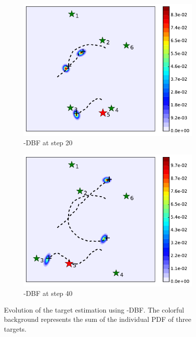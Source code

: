 \begin{figure}
\begin{subfigure}[b]{0.23\textwidth}
			\includegraphics[width=\textwidth]{figures/dbf_hetero_mov_sen_mov_tar_rbt5_step20}
			\caption{\proto-DBF at step 20}\label{fig:step20}
		\end{subfigure}	
		\begin{subfigure}[b]{0.23\textwidth}
			\includegraphics[width=\textwidth]{figures/dbf_hetero_mov_sen_mov_tar_rbt5_step40}
			\caption{\proto-DBF at step 40}\label{fig:step40}
		\end{subfigure}			
		\caption{Evolution of the target estimation using \proto-DBF. The colorful background represents the sum of the individual PDF of three targets.}
		\label{fig:mov_sen_mov_tar1}
	\end{figure}
	
